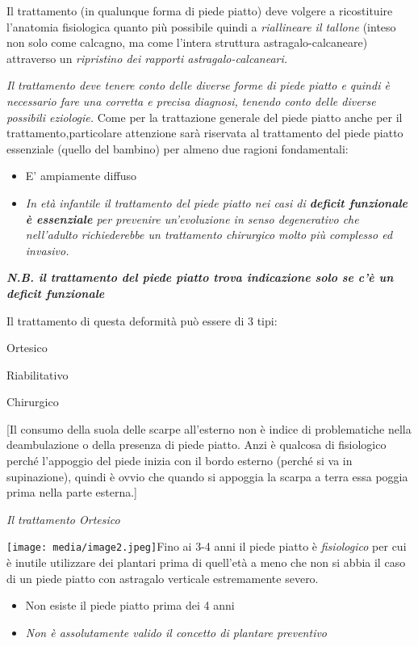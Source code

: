 \documentclass[]{article}
\begin{document}
Il trattamento (in qualunque forma di piede piatto) deve volgere a
ricostituire l'anatomia fisiologica quanto più possibile quindi a
\emph{riallineare il tallone} (inteso non solo come calcagno, ma come
l'intera struttura astragalo-calcaneare) attraverso un \emph{ripristino
dei rapporti astragalo-calcaneari. }

\emph{Il trattamento deve tenere conto delle diverse forme di piede
piatto e quindi è necessario fare una corretta e precisa diagnosi,
tenendo conto delle diverse possibili eziologie.} Come per la
trattazione generale del piede piatto anche per il
trattamento,particolare attenzione sarà riservata al trattamento del
piede piatto essenziale (quello del bambino) per almeno due ragioni
fondamentali:

\begin{itemize}
\item
  E' ampiamente diffuso
\item
  \emph{In età infantile il trattamento del piede piatto nei casi di
  \textbf{deficit funzionale è essenziale} per prevenire un'evoluzione
  in senso degenerativo che nell'adulto richiederebbe un trattamento
  chirurgico molto più complesso ed invasivo.}
\end{itemize}

\textbf{\emph{N.B. il trattamento del piede piatto trova indicazione
solo se c'è un deficit funzionale}}

Il trattamento di questa deformità può essere di 3 tipi:

Ortesico

Riabilitativo

Chirurgico

{[}Il consumo della suola delle scarpe all'esterno non è indice di
problematiche nella deambulazione o della presenza di piede piatto. Anzi
è qualcosa di fisiologico perché l'appoggio del piede inizia con il
bordo esterno (perché si va in supinazione), quindi è ovvio che quando
si appoggia la scarpa a terra essa poggia prima nella parte esterna.{]}

\emph{Il trattamento Ortesico}

\texttt{[image: media/image2.jpeg]}Fino
ai 3-4 anni il piede piatto è \emph{fisiologico} per cui è inutile
utilizzare dei plantari prima di quell'età a meno che non si abbia il
caso di un piede piatto con astragalo verticale estremamente severo.

\begin{itemize}
\item
  Non esiste il piede piatto prima dei 4 anni
\item
  \emph{Non è assolutamente valido il concetto di plantare preventivo}
\end{itemize}
\end{document}
